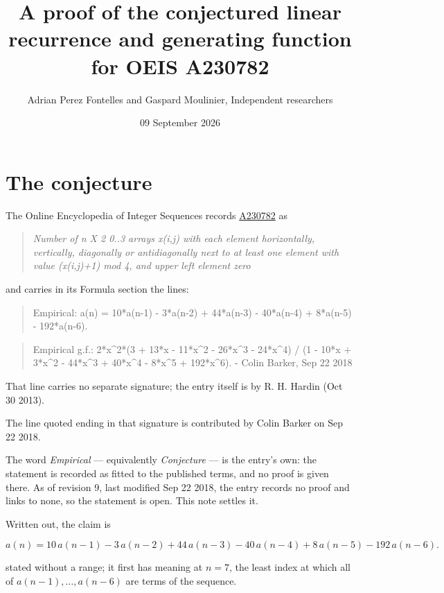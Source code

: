 \documentclass[11pt]{article}
\title{A proof of the conjectured linear recurrence and generating function for OEIS A230782}
\author{Adrian Perez Fontelles and Gaspard Moulinier, Independent researchers}
\date{09 September 2026}
\theoremstyle{definition}
\begin{document}
\maketitle
\section{The conjecture}

The Online Encyclopedia of Integer Sequences records \href{https://oeis.org/A230782}{A230782} as

\begin{quote}\itshape Number of n X 2 0..3 arrays x(i,j) with each element horizontally, vertically, diagonally or antidiagonally next to at least one element with value (x(i,j)+1) mod 4, and upper left element zero\end{quote}

and carries in its Formula section the lines:

\begin{quote}\ttfamily Empirical: a(n) = 10*a(n-1) - 3*a(n-2) + 44*a(n-3) - 40*a(n-4) + 8*a(n-5) - 192*a(n-6).\end{quote}

\begin{quote}\ttfamily Empirical g.f.: 2*x\textasciicircum{}2*(3 + 13*x - 11*x\textasciicircum{}2 - 26*x\textasciicircum{}3 - 24*x\textasciicircum{}4) / (1 - 10*x + 3*x\textasciicircum{}2 - 44*x\textasciicircum{}3 + 40*x\textasciicircum{}4 - 8*x\textasciicircum{}5 + 192*x\textasciicircum{}6). - Colin Barker, Sep 22 2018\end{quote}

That line carries no separate signature; the entry itself is by R. H. Hardin (Oct 30 2013).

The line quoted ending in that signature is contributed by Colin Barker on Sep 22 2018.

The word {\itshape Empirical} --- equivalently {\itshape Conjecture} --- is the entry's own: the statement is recorded as fitted to the published terms, and no proof is given there. As of revision 9, last modified Sep 22 2018, the entry records no proof and links to none, so the statement is open. This note settles it.

Written out, the claim is

\[a(n) = 10\,a(n-1) - 3\,a(n-2) + 44\,a(n-3) - 40\,a(n-4) + 8\,a(n-5) - 192\,a(n-6).\]

stated without a range; it first has meaning at $n = 7$, the least index at which all of $a(n-1),\dots,a(n-6)$ are terms of the sequence.
\end{document}
